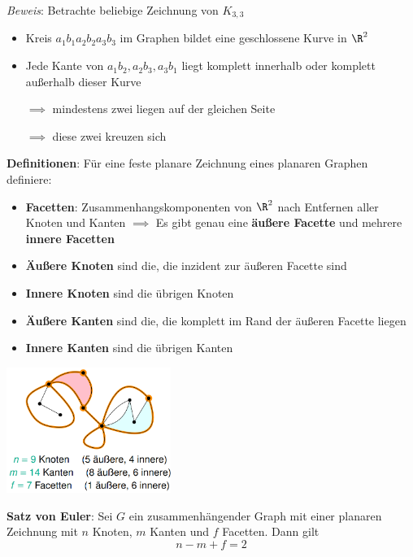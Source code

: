 \textit{Beweis}: Betrachte beliebige Zeichnung von $K_{3,3}$
\begin{itemize}
	\item Kreis $a_1b_1a_2b_2a_3b_3$ im Graphen bildet eine geschlossene Kurve in $\R^2$
	\item Jede Kante von $a_1b_2, a_2b_3, a_3b_1$ liegt komplett innerhalb oder komplett außerhalb dieser Kurve
	
	$\implies$ mindestens zwei liegen auf der gleichen Seite
	
	$\implies$ diese zwei kreuzen sich
\end{itemize}
\bigskip
\textbf{Definitionen}: Für eine feste planare Zeichnung eines planaren Graphen definiere:
\begin{itemize}
	\item \textbf{Facetten}: Zusammenhangskomponenten von $\R^2$ nach Entfernen aller Knoten und Kanten $\implies$ Es gibt genau eine \textbf{äußere Facette} und mehrere \textbf{innere Facetten}
	\item \textbf{Äußere Knoten} sind die, die inzident zur äußeren Facette sind
	\item \textbf{Innere Knoten} sind die übrigen Knoten
	\item \textbf{Äußere Kanten} sind die, die komplett im Rand der äußeren Facette liegen 
	\item \textbf{Innere Kanten} sind die übrigen Kanten
\end{itemize}
\begin{center}
	\includegraphics[width=0.4\textwidth]{images/facette.png}
\end{center}
\bigskip
\textbf{Satz von Euler}: Sei $G$ ein zusammenhängender Graph mit einer planaren Zeichnung mit $n$ Knoten, $m$ Kanten und $f$ Facetten. Dann gilt
$$n-m+f=2$$
